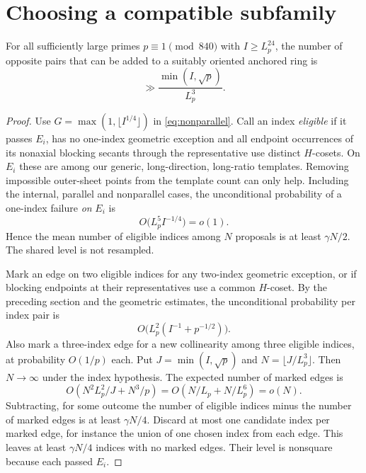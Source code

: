 \documentclass[11pt]{article}
\begin{document}
\section{Choosing a compatible subfamily}
\begin{proposition}\label{prop:index} For all sufficiently large primes $p\equiv1\pmod{840}$ with $I\ge L_p^{24}$, the number of opposite pairs that can be added to a suitably oriented anchored ring is
\[
 \gg \frac{\min(I,\sqrt p)}{L_p^3}.
\]
\end{proposition}
\begin{proof} Use $G=\max(1,\lfloor I^{1/4}\rfloor)$ in \eqref{eq:nonparallel}. Call an index \emph{eligible} if it passes $E_i$, has no one-index geometric exception and all endpoint occurrences of its nonaxial blocking secants through the representative use distinct $H$-cosets. On $E_i$ these are among our generic, long-direction, long-ratio templates. Removing impossible outer-sheet points from the template count can only help. Including the internal, parallel and nonparallel cases, the unconditional probability of a one-index failure \emph{on} $E_i$ is
\begin{equation}\label{eq:one}
 O\big(L_p^5 I^{-1/4}\big)=o(1).
\end{equation}
Hence the mean number of eligible indices among $N$ proposals is at least $\gamma N/2$. The shared level is not resampled.

Mark an edge on two eligible indices for any two-index geometric exception, or if blocking endpoints at their representatives use a common $H$-coset. By the preceding section and the geometric estimates, the unconditional probability per index pair is
\begin{equation}\label{eq:two}
 O\big(L_p^2 (I^{-1}+p^{-1/2})\big).
\end{equation}
Also mark a three-index edge for a new collinearity among three eligible indices, at probability $O(1/p)$ each. Put $J=\min(I,\sqrt p)$ and $N=\lfloor J/L_p^3\rfloor$. Then $N\to\infty$ under the index hypothesis. The expected number of marked edges is
\[
 O(N^2 L_p^2/J+N^3/p)=O(N/L_p+N/L_p^6)=o(N).
\]
Subtracting, for some outcome the number of eligible indices minus the number of marked edges is at least $\gamma N/4$. Discard at most one candidate index per marked edge, for instance the union of one chosen index from each edge. This leaves at least $\gamma N/4$ indices with no marked edges. Their level is nonsquare because each passed $E_i$.


\end{proof}
\end{document}
